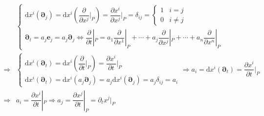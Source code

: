 \documentclass[
]{book}
\theoremstyle{definition}
\theoremstyle{definition}
\theoremstyle{definition}
\theoremstyle{definition}
\theoremstyle{remark}
\begin{document}
\[
\begin{aligned}
 & \begin{cases}
\mathrm{d}x^{{\scriptscriptstyle i}}\left(\boldsymbol{\partial}_{{\scriptscriptstyle j}}\right)=\mathrm{d}x^{{\scriptscriptstyle i}}\left(\dfrac{\partial}{\partial x^{{\scriptscriptstyle j}}}|_{{\scriptscriptstyle P}}\right)=\dfrac{\partial x^{{\scriptscriptstyle i}}}{\partial x^{{\scriptscriptstyle j}}}|_{{\scriptscriptstyle P}}=\delta_{{\scriptscriptstyle ij}}=\begin{cases}
1 & i=j\\
0 & i\ne j
\end{cases}\\
\boldsymbol{\partial}_{{\scriptscriptstyle t}}=a_{{\scriptscriptstyle j}}\boldsymbol{e}_{{\scriptscriptstyle j}}=a_{{\scriptscriptstyle j}}\boldsymbol{\partial}_{{\scriptscriptstyle j}}\Leftrightarrow\dfrac{\partial}{\partial t}|_{{\scriptscriptstyle P}}=a_{{\scriptscriptstyle 1}}\dfrac{\partial}{\partial x^{{\scriptscriptstyle 1}}}|_{{\scriptscriptstyle P}}+\cdots+a_{{\scriptscriptstyle j}}\dfrac{\partial}{\partial x^{{\scriptscriptstyle j}}}|_{{\scriptscriptstyle P}}+\cdots+a_{{\scriptscriptstyle n}}\dfrac{\partial}{\partial x^{{\scriptscriptstyle n}}}|_{{\scriptscriptstyle P}}
\end{cases}\\
\Rightarrow & \begin{cases}
\mathrm{d}x^{{\scriptscriptstyle i}}\left(\boldsymbol{\partial}_{{\scriptscriptstyle t}}\right)=\mathrm{d}x^{{\scriptscriptstyle i}}\left(\dfrac{\partial}{\partial t}|_{{\scriptscriptstyle P}}\right)=\dfrac{\partial x^{{\scriptscriptstyle i}}}{\partial t}|_{{\scriptscriptstyle P}}\\
\mathrm{d}x^{{\scriptscriptstyle i}}\left(\boldsymbol{\partial}_{{\scriptscriptstyle t}}\right)=\mathrm{d}x^{{\scriptscriptstyle i}}\left(a_{{\scriptscriptstyle j}}\boldsymbol{\partial}_{{\scriptscriptstyle j}}\right)=a_{{\scriptscriptstyle j}}\mathrm{d}x^{{\scriptscriptstyle i}}\left(\boldsymbol{\partial}_{{\scriptscriptstyle j}}\right)=a_{{\scriptscriptstyle j}}\delta_{{\scriptscriptstyle ij}}=a_{{\scriptscriptstyle i}}
\end{cases}\Rightarrow a_{{\scriptscriptstyle i}}=\mathrm{d}x^{{\scriptscriptstyle i}}\left(\boldsymbol{\partial}_{{\scriptscriptstyle t}}\right)=\dfrac{\partial x^{{\scriptscriptstyle i}}}{\partial t}|_{{\scriptscriptstyle P}}\\
\Rightarrow & a_{{\scriptscriptstyle i}}=\dfrac{\partial x^{{\scriptscriptstyle i}}}{\partial t}|_{{\scriptscriptstyle P}}\Rightarrow a_{{\scriptscriptstyle j}}=\dfrac{\partial x^{{\scriptscriptstyle j}}}{\partial t}|_{{\scriptscriptstyle P}}=\partial_{{\scriptscriptstyle t}}x^{{\scriptscriptstyle j}}|_{{\scriptscriptstyle P}}\\

\end{aligned}\]
\end{document}
